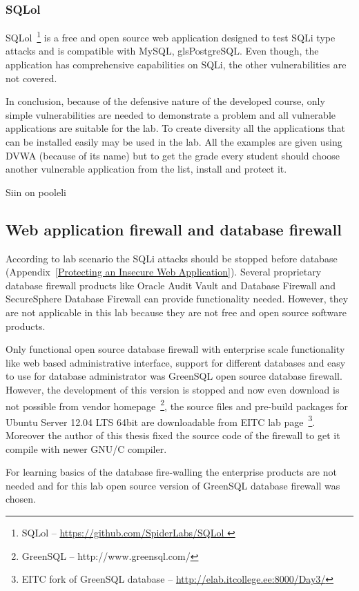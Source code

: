 \subsubsection{SQLol}
SQLol~\footnote{SQLol -- \url{https://github.com/SpiderLabs/SQLol
}} is a free and open source web application designed to test \gls{SQLi} type attacks and is compatible with \gls{MySQL}, gls{PostgreSQL}. Even though, the application has comprehensive capabilities on \gls{SQLi}, the other vulnerabilities are not covered.


In conclusion, because of the defensive nature of the developed course, only simple vulnerabilities are needed to demonstrate a problem and all vulnerable applications are suitable for the lab. To create diversity all the applications that can be installed easily may be used in the lab. All the examples are given using \gls{DVWA} (because of its name) but to get the grade every student should choose another vulnerable application from the list, install  and protect it.

{\color{red} Siin on pooleli}
\subsection{Web application firewall and database firewall}


According to lab scenario the \gls{SQLi} attacks should be stopped before database (Appendix~\ref{Protecting an Insecure Web Application}). Several proprietary database firewall products like Oracle Audit Vault and Database Firewall and SecureSphere Database Firewall can provide functionality needed. However, they are not applicable in this lab because they are not free and open source software products.

Only functional open source database firewall with enterprise scale functionality like web based administrative interface, support for different databases and easy to use for database administrator was GreenSQL open source database firewall. However, the development of this version is stopped and now even download is not possible from vendor homepage~\footnote{GreenSQL -- http://www.greensql.com/}, the source files and pre-build packages for Ubuntu Server 12.04 LTS 64bit are downloadable from \gls{EITC} lab page~\footnote{\gls{EITC} fork of GreenSQL database -- \url{http://elab.itcollege.ee:8000/Day3/}}. Moreover the author of this thesis fixed the source code of the firewall to get it compile with newer GNU/C compiler.

For learning basics of the database fire-walling the enterprise products are not needed and for this lab open source version of GreenSQL database firewall was chosen.

